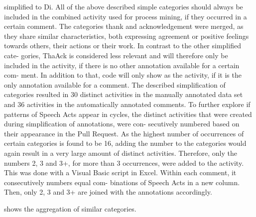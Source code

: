 simplified to Di. All of the above described simple categories should always
be included in the combined activity used for process mining, if they occurred
in a certain comment.
The categories thank and acknowledgement were merged, as they share
similar characteristics, both expressing agreement or positive feelings towards
others, their actions or their work. In contrast to the other simplified cate-
gories, ThaAck is considered less relevant and will therefore only be included
in the activity, if there is no other annotation available for a certain com-
ment. In addition to that, code will only show as the activity, if it is the only
annotation available for a comment.
The described simplification of categories resulted in 30 distinct activities
in the manually annotated data set and 36 activities in the automatically
annotated comments.
To further explore if patterns of Speech Acts appear in cycles, the distinct
activities that were created during simplification of annotations, were con-
secutively numbered based on their appearance in the Pull Request. As the
highest number of occurrences of certain categories is found to be 16, adding
the number to the categories would again result in a very large amount of
distinct activities. Therefore, only the numbers 2, 3 and 3+, for more than 3
occurrences, were added to the activity. This was done with a Visual Basic
script in Excel. Within each comment, it consecutively numbers equal com-
binations of Speech Acts in a new column. Then, only 2, 3 and 3+ are joined
with the annotations accordingly.



 shows the aggregation of similar categories. 

